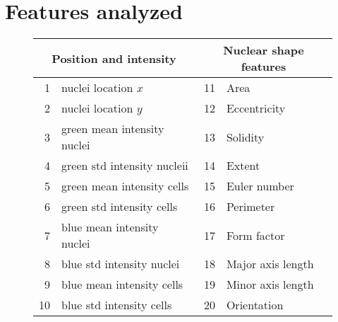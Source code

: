 \documentclass[oneside, a4paper, draft]{memoir} %
\begin{document}
\chapter{Features analyzed}\label{app:featurelist}
\begin{figure}[here]
\footnotesize
\centering

\begin{tabularx}{300pt}{| rX | rX |}
	\hline
	\multicolumn{2}{|c}{\textbf{Position and intensity}} & \multicolumn{2}{|c|}{\textbf{Nuclear shape features}}\\
	\hline
	1 & nuclei location $x$ & 11 & Area\\
	2 & nuclei location $y$ & 12 & Eccentricity\\

	3 & green mean intensity nuclei & 13 & Solidity\\
	4 & green std intensity nucleii & 14 & Extent\\

	5 & green mean intensity cells & 15 & Euler number\\
	6 & green std intensity cells & 16 & Perimeter\\

	7 & blue mean intensity nuclei & 17 & Form factor\\
	8 & blue std intensity nuclei & 18 & Major axis length\\

	9 & blue mean intensity cells & 19 & Minor axis length\\
	10 & blue std intensity cells & 20 & Orientation\\
	\hline	
\end{tabularx}

\vspace{0.5cm}


\end{figure}
\end{document}
